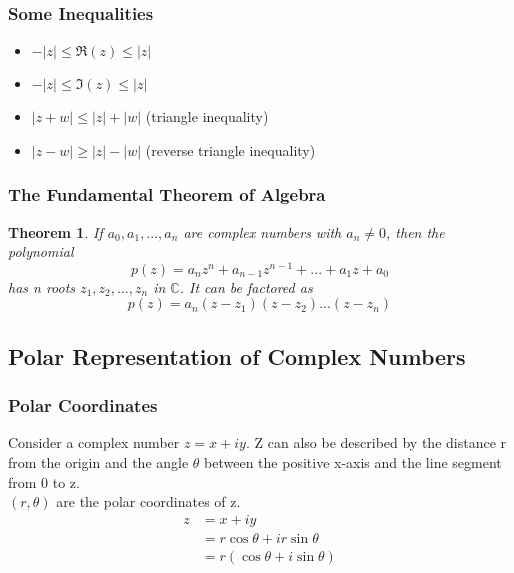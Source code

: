 \documentclass{article}
\newtheorem{theorem}{Theorem}[section]
\begin{document}
\subsubsection{Some Inequalities}
\begin{itemize}
\item $-\left|z\right| \leq \Re (z) \leq \left|z\right|$
\item $-\left|z\right| \leq \Im (z) \leq \left|z\right|$
\item $\left|z + w\right| \leq \left|z\right| + \left|w\right|$ (triangle inequality)
\item $\left|z - w\right| \geq \left|z\right| - \left|w\right|$ (reverse triangle inequality)
\end{itemize}

\subsubsection{The Fundamental Theorem of Algebra}
\begin{theorem}
If $a_0, a_1,..., a_n$ are complex numbers with $a_n \neq 0$, then the polynomial
\begin{equation*}
p(z) = a_nz^n + a_{n-1}z^{n-1} + ... + a_1z + a_0
\end{equation*}
has n roots $z_1, z_2,..., z_n$ in $\mathbb{C}$. It can be factored as
\begin{equation*}
p(z) = a_n(z - z_1)(z - z_2)...(z - z_n)
\end{equation*}
\end{theorem}

\subsection{Polar Representation of Complex Numbers}

\subsubsection{Polar Coordinates}
Consider a complex number $z = x + iy$. Z can also be described by the distance r from the origin and the angle $\theta$ between the positive x-axis and the line segment from 0 to z. \\
$(r, \theta)$ are the polar coordinates of z. \\
\begin{align*}
z &= x + iy \\
&= r \cos\theta + ir \sin\theta \\
&= r(\cos\theta + i \sin\theta)
\end{align*}
\end{document}
